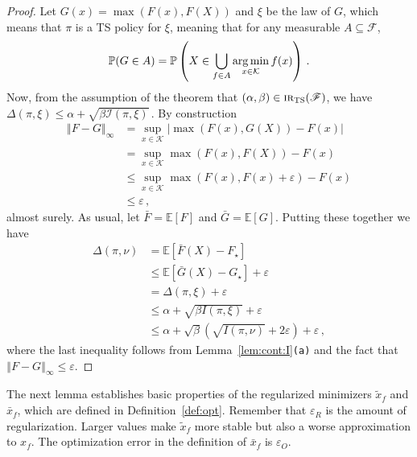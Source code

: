 \documentclass[letter, 12pt]{report}
\newcommand{\epsR}{{\epsilon_R}}
\newcommand{\epsO}{{\epsilon_O}}
\newcommand{\argmin}{\operatornamewithlimits{arg\,min}}
\newcommand{\norm}[1]{\left \Vert  #1 \right \Vert}
\newcommand{\E}{\mathbb E}
\newcommand{\cK}{\mathcal K}
\newcommand{\cF}{\mathcal F}
\newcommand{\sF}{\mathscr F}
\newcommand{\cI}{\mathcal I}
\newcommand{\1}{\mathbf{1}}
\newcommand{\mP}{\mathbb{P}}
\newcommand{\IR}{\operatorname{\textsc{ir}}}
\newcommand{\ts}{\textsc{TS}\xspace}
\renewcommand{\epsilon}{\varepsilon}
\theoremstyle{plain}
\theoremstyle{definition}
\theoremstyle{remark}
\begin{document}
\begin{proof}
    Let $G(x) = \max(F(x), F(X))$ and $\xi$ be the law of $G$, which means that $\pi$ is a \ts{} policy for $\xi$, meaning that for any measurable $A \subseteq \cF$,
    \begin{align*}
        \mP(G \in A) = \mP\left(X \in \bigcup_{f \in A} \argmin_{x \in \cK} f(x)\right)\,.
    \end{align*}
    Now, from the assumption of the theorem that $(\alpha, \beta) \in \IR_\ts(\sF)$, we have
    $\Delta(\pi, \xi) \leq \alpha + \sqrt{\beta \cI(\pi, \xi)}$\,.
    By construction
    \begin{align*}
        \norm{F - G}_\infty
         & =
        \sup_{x \in \cK} |\max(F(x), G(X)) - F(x)|          \\
         & =
        \sup_{x \in \cK} \max(F(x), F(X)) - F(x)            \\
         & \leq
        \sup_{x \in \cK} \max(F(x), F(x) + \epsilon) - F(x) \\
         & \leq \epsilon\,,
    \end{align*}
    almost surely.
    As usual, let $\bar F = \E[F]$ and $\bar G = \E[G]$.
    Putting these together we have
    \begin{align*}
        \Delta(\pi, \nu)
         & = \E[\bar F(X) - F_\star]                                                   \\
         & \leq \E[\bar G(X) - G_\star] + \epsilon                                     \\
         & = \Delta(\pi, \xi) + \epsilon                                               \\
         & \leq \alpha + \sqrt{\beta I(\pi, \xi)} + \epsilon                           \\
         & \leq \alpha + \sqrt{\beta} (\sqrt{I(\pi, \nu)} + 2 \epsilon) + \epsilon \,,
    \end{align*}
    where the last inequality follows from Lemma~\ref{lem:cont:I}\texttt{(a)} and the fact that $\norm{F - G}_\infty \leq \epsilon$.
\end{proof}

The next lemma establishes basic properties of the regularized minimizers $\tilde x_f$ and $\bar x_f$, which are defined
in Definition~\ref{def:opt}.
Remember that $\epsR$ is the amount of regularization. Larger values make $\tilde x_f$ more stable but also a worse approximation to $x_f$.
The optimization error in the definition of $\bar x_f$ is $\epsO$.
\end{document}
